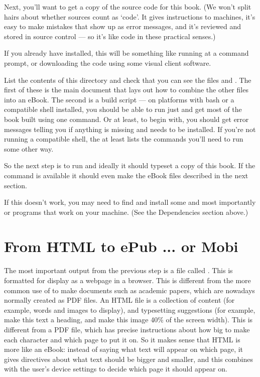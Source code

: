 Next, you'll want to get a copy of the source code for this
book. (We won't split hairs about whether \latex sources count as
`code'. It gives instructions to machines, it's easy to make mistakes
that show up as error messages, and it's reviewed and stored in source
control --- so it's like code in these practical senses.)

If you already have  installed, this will be something
like running  at a command prompt, or
downloading the code using some visual client software. 

List the contents of this directory and check that you can see the
files  and . The first of these
is the main \tex document that lays out how to combine the other files
into an eBook.  The second is a build script --- on platforms with
bash or a compatible shell installed, you should be able to run just
 and get most of the book built using one
command. Or at least, to begin with, you should get error messages
telling you if anything is missing and needs to be installed. If you're not
running a compatible shell, the  at least lists
the commands you'll need to run some other way.

So the next step is to run  and ideally it should
typeset a copy of this book. If the  command is
available it should even make the eBook files described in the next
section.

If this doesn't work, you may need to find and install some
 and most importantly  or
 programs that work on your machine. (See the
Dependencies section above.)

\section{From HTML to ePub ... or Mobi}
\label{sec:html2epub}

The most important output from the previous step is a file called
.  This is formatted for display as a webpage
in a browser. This is different from the more common use of \tex to
make documents such as academic papers, which are nowadays normally
created as PDF files. An HTML file is a collection of content (for
example, words and images to display), and typesetting suggestions
(for example, make this text a heading, and make this image 40\% of
the screen width). This is different from a PDF file, which has
precise instructions about how big to make each character and which
page to put it on. So it makes sense that HTML is more like an eBook:
instead of saying what text will appear on which page, it gives
directives about what text should be bigger and smaller, and this
combines with the user's device settings to decide which page it
should appear on.

